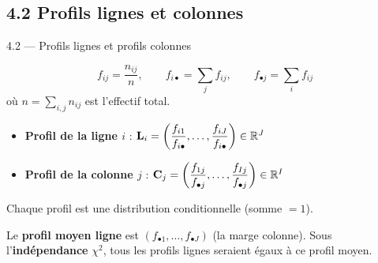 \subsection{4.2 Profils lignes et colonnes}
\begin{frame}{4.2 — Profils lignes et profils colonnes}
\begin{definition}
\[
f_{ij} = \frac{n_{ij}}{n}, \qquad
f_{i \bullet} = \sum_j f_{ij}, \qquad
f_{\bullet j} = \sum_i f_{ij}
\]
où $n = \sum_{i,j} n_{ij}$ est l'effectif total.
\end{definition}

\begin{definition}
\begin{itemize}
  \item \textbf{Profil de la ligne $i$} :
        $\mathbf{L}_i = \left(\dfrac{f_{i1}}{f_{i\bullet}}, \ldots, \dfrac{f_{iJ}}{f_{i\bullet}}\right) \in \mathbb{R}^J$
  \item \textbf{Profil de la colonne $j$} :
        $\mathbf{C}_j = \left(\dfrac{f_{1j}}{f_{\bullet j}}, \ldots, \dfrac{f_{Ij}}{f_{\bullet j}}\right) \in \mathbb{R}^I$
\end{itemize}
Chaque profil est une \alert{distribution conditionnelle} (somme $= 1$).
\end{definition}

\begin{rema}
\small Le \textbf{profil moyen ligne} est $(f_{\bullet 1}, \ldots, f_{\bullet J})$ (la marge colonne).
Sous l'\textbf{indépendance} $\chi^2$, tous les profils lignes seraient égaux à ce profil moyen.
\end{rema}
\end{frame}

